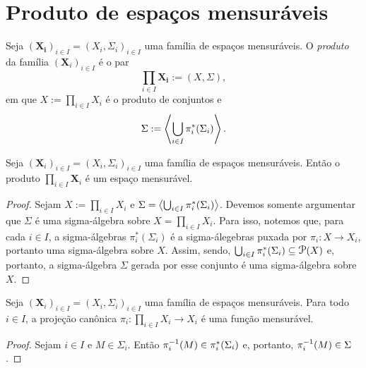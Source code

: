 \clearpage
\section{Produto de espaços mensuráveis}

\begin{defi}
Seja $(\bm{X_i})_{i \in I} = (X_i,\Sigma_i)_{i \in I}$ uma família de espaços mensuráveis. O \emph{produto} da família $(\bm X_i)_{i \in I}$ é o par
	\begin{equation*}
	\prod_{i \in I} \bm{X_i} := (X,\Sigma),
	\end{equation*}
em que $X := \prod_{i \in I} X_i$ é o produto de conjuntos e
	\begin{equation*}
	\Sigma := \left\langle \bigcup_{i \in I} \pi_i^*(\Sigma_i) \right\rangle.
	\end{equation*}
\end{defi}

\begin{prop}
Seja $(\bm X_i)_{i \in I} = (X_i,\Sigma_i)_{i \in I}$ uma família de espaços mensuráveis. Então o produto $\prod_{i \in I} \bm X_i$ é um espaço mensurável.
\end{prop}
\begin{proof}
Sejam $X := \prod_{i \in I} X_i$ e $\Sigma=\left\langle \bigcup_{i \in I} \pi_i^*(\Sigma_i) \right\rangle$. Devemos somente argumentar que $\Sigma$ é uma sigma-álgebra sobre $X= \prod_{i \in I} X_i$. Para isso, notemos que, para cada $i \in I$, a sigma-álgebras $\pi_i^*(\Sigma_i)$ é a sigma-álegebras puxada por $\pi_i: X \to X_i$, portanto uma sigma-álgebra sobre $X$. Assim, sendo, $\bigcup_{i \in I} \pi_i^*(\Sigma_i) \subseteq \p(X)$ e, portanto, a sigma-álgebra $\Sigma$ gerada por esse conjunto é uma sigma-álgebra sobre $X$.
\end{proof}

\begin{prop}
Seja $(\bm X_i)_{i \in I} = (X_i,\Sigma_i)_{i \in I}$ uma família de espaços mensuráveis. Para todo $i \in I$, a projeção canônica $\pi_i: \prod_{i \in I} X_i \to X_i$ é uma função mensurável.
\end{prop}
\begin{proof}
Sejam $i \in I$ e $M \in \Sigma_i$. Então $\pi_i^{-1}(M) \in \pi_i^*(\Sigma_i)$ e, portanto, $\pi_i^{-1}(M) \in \Sigma$.
\end{proof}

